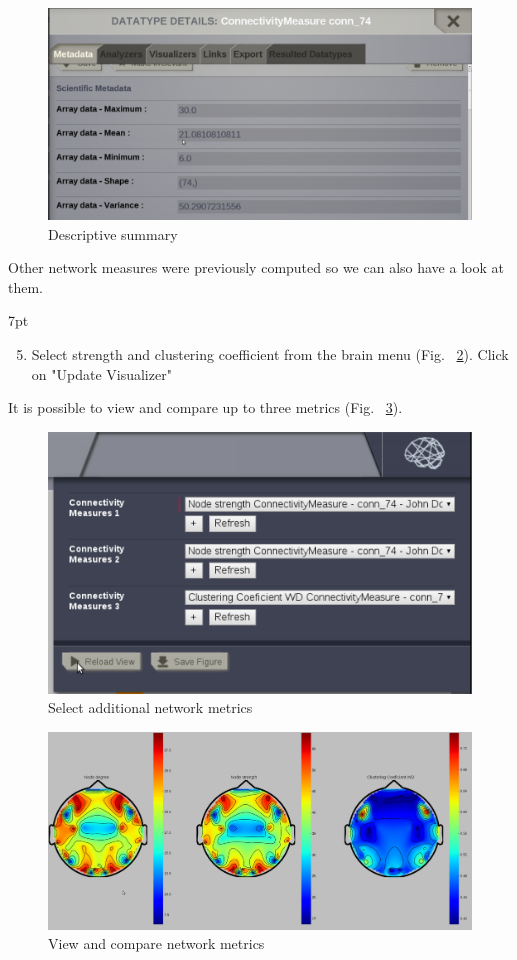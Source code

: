 \documentclass{tufte-handout}
\newenvironment{formal}{%
  \def\FrameCommand{%
    \hspace{1pt}%
    {\color{DarkBlue}\vrule width 2pt}%
    {\color{formalshade}\vrule width 4pt}%
    \colorbox{formalshade}%
  }%
  \MakeFramed{\advance\hsize-\width\FrameRestore}%
  \noindent\hspace{-4.55pt}%
  \begin{adjustwidth}{}{7pt}%
  \vspace{2pt}\vspace{2pt}%
}
{%
  \vspace{2pt}\end{adjustwidth}\endMakeFramed%
}
\begin{document}
\begin{figure}[h]
  \includegraphics[width=\linewidth]{Handout_UI_ModellingStructuralLesions_AnalysisResult}%
  \caption{Descriptive summary}%
  \label{fig:step_02}%
\end{figure}

\noindent Other network measures were previously computed so we can also have a look at them. 
\begin{formal}
  \begin{enumerate}[resume] %
  \setcounter{enumi}{4}
  \item Select strength and clustering coefficient from the brain menu (Fig. ~\ref{fig:step_05}). Click on "Update Visualizer"
  \end{enumerate}
\end{formal}
\noindent It is possible to view and compare up to three metrics (Fig. ~\ref{fig:step_05b}).
\begin{figure}[h]
  \includegraphics[width=0.5\linewidth]{Handout_UI_ModellingStructuralLesions_AnalysisView}%
  \caption{Select additional network metrics}%
  \label{fig:step_05}%
\end{figure}

\begin{figure}[h]
  \includegraphics[width=0.9\linewidth]{Handout_UI_ModellingStructuralLesions_AnalysisResultCompare}%
  \caption{View and compare network metrics}%
  \label{fig:step_05b}%
\end{figure}
\newpage
\end{document}
